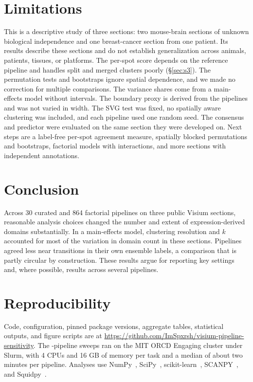 \section{Limitations}
This is a descriptive study of three sections: two mouse-brain sections of
unknown biological independence and one breast-cancer section from one
patient. Its results describe these sections and do not establish
generalization across animals, patients, tissues, or platforms. The
per-spot score depends on the reference pipeline and handles split and
merged clusters poorly (\S\ref{sec:s3}). The permutation tests and
bootstraps ignore spatial dependence, and we made no correction for
multiple comparisons. The variance shares come from a main-effects model
without intervals. The boundary proxy is derived from the pipelines and
was not varied in width. The SVG test was fixed, no spatially aware
clustering was included, and each pipeline used one random seed. The consensus and
predictor were evaluated on the same section they were developed on. Next
steps are a label-free per-spot agreement measure, spatially blocked
permutations and bootstraps, factorial models with interactions, and more
sections with independent annotations.

\section{Conclusion}
Across 30 curated and 864 factorial pipelines on three public Visium
sections, reasonable analysis choices changed the number and extent of
expression-derived domains substantially. In a main-effects model,
clustering resolution and $k$ accounted for most of the variation in
domain count in these sections. Pipelines agreed less near transitions in
their own ensemble labels, a comparison that is partly circular by
construction. These results argue for reporting key settings and, where
possible, results across several pipelines.

\section*{Reproducibility}
Code, configuration, pinned package versions, aggregate tables, statistical
outputs, and figure scripts are at
\url{https://github.com/ImSpxrsh/visium-pipeline-sensitivity}. The \FullNspecs{}-pipeline
sweeps ran on the MIT ORCD Engaging cluster under Slurm, with 4 CPUs and
16 GB of memory per task and a median of about two minutes per pipeline.
Analyses use NumPy~\cite{harris2020array}, SciPy~\cite{virtanen2020scipy},
scikit-learn~\cite{pedregosa2011scikit}, SCANPY~\cite{wolf2018scanpy}, and
Squidpy~\cite{palla2022squidpy}.


